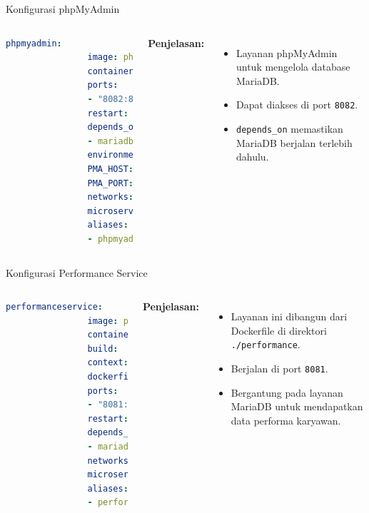 \documentclass[aspectratio=169, table]{beamer}
\begin{document}
\begin{frame}[fragile]{Konfigurasi phpMyAdmin}
	\vspace{20pt}
	\begin{columns}
		\begin{lstlisting}[language=yaml]
			phpmyadmin:
				image: phpmyadmin/phpmyadmin:latest
				container_name: phpmyadmin
				ports:
				- "8082:80"
				restart: always
				depends_on:
				- mariadb
				environment:
				PMA_HOST: mariadb
				PMA_PORT: 3306
				networks:
				microservices:
				aliases:
				- phpmyadmin
		\end{lstlisting}
		
		\textbf{Penjelasan:}
		\begin{itemize}
			\item Layanan phpMyAdmin untuk mengelola database MariaDB.
			\item Dapat diakses di port \texttt{8082}.
			\item \texttt{depends\_on} memastikan MariaDB berjalan terlebih dahulu.
		\end{itemize}
	\end{columns}
\end{frame}

\begin{frame}[fragile]{Konfigurasi Performance Service}
	\vspace{20pt}
	\begin{columns}
		\column{0.55\textwidth}
		\begin{lstlisting}[language=yaml]
			performanceservice:                        
				image: performance-service               
				container_name: performance-service-app 
				build:
				context: ./performance                          
				dockerfile: Dockerfile              
				ports:
				- "8081:8081"                       
				restart: always
				depends_on:                           
				- mariadb
				networks:
				microservices:
				aliases:
				- performanceservice
		\end{lstlisting}
		
		\column{0.45\textwidth}
		\textbf{Penjelasan:}
		\begin{itemize}
			\item Layanan ini dibangun dari Dockerfile di direktori \texttt{./performance}.
			\item Berjalan di port \texttt{8081}.
			\item Bergantung pada layanan MariaDB untuk mendapatkan data performa karyawan.
		\end{itemize}
	\end{columns}
\end{frame}
\end{document}
